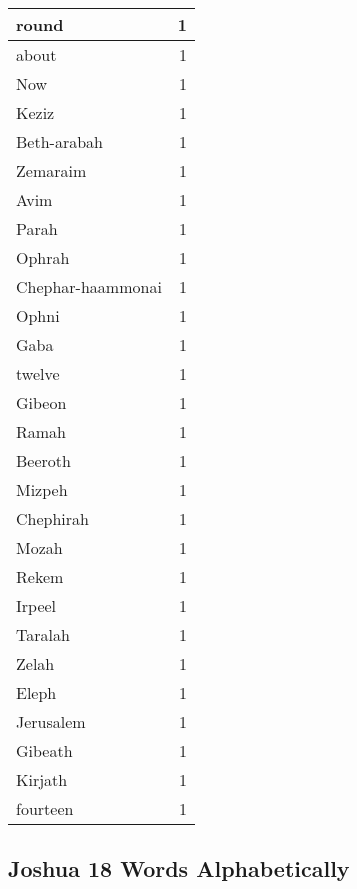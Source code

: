 \begin{center}
\begin{longtable}{l|r}
round & 1\\ \hline 
about & 1\\ \hline 
Now & 1\\ \hline 
Keziz & 1\\ \hline 
Beth-arabah & 1\\ \hline 
Zemaraim & 1\\ \hline 
Avim & 1\\ \hline 
Parah & 1\\ \hline 
Ophrah & 1\\ \hline 
Chephar-haammonai & 1\\ \hline 
Ophni & 1\\ \hline 
Gaba & 1\\ \hline 
twelve & 1\\ \hline 
Gibeon & 1\\ \hline 
Ramah & 1\\ \hline 
Beeroth & 1\\ \hline 
Mizpeh & 1\\ \hline 
Chephirah & 1\\ \hline 
Mozah & 1\\ \hline 
Rekem & 1\\ \hline 
Irpeel & 1\\ \hline 
Taralah & 1\\ \hline 
Zelah & 1\\ \hline 
Eleph & 1\\ \hline 
Jerusalem & 1\\ \hline 
Gibeath & 1\\ \hline 
Kirjath & 1\\ \hline 
fourteen & 1\\ \hline 
\end{longtable}
\end{center}





\subsection{Joshua 18 Words Alphabetically}


\normalsize
 
